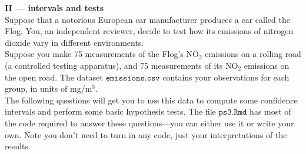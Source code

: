 \documentclass[10pt]{extarticle}
\begin{document}
\hfill 




{\Large \bf II --- intervals and tests} \\ 

Suppose that a notorious European car manufacturer produces a car called the Flog. You, an independent reviewer, decide to test how its emissions of nitrogen dioxide vary in different environments. \\ 

Suppose you make 75 measurements of the Flog's NO$_2$ emissions on a rolling road (a controlled testing apparatus), and 75 measurements of its NO$_2$ emissions on the open road. The dataset $\texttt{emissions.csv}$ contains your observations for each group, in units of mg/m$^3$. \\ 

The following questions will get you to use this data to compute some confidence intervals and perform some basic hypothesis tests. The file $\texttt{ps3.Rmd}$ has most of the code required to answer these questions---you can either use it or write your own. Note you don't need to turn in any code, just your interpretations of the results.   

\hfill  
\end{document}
